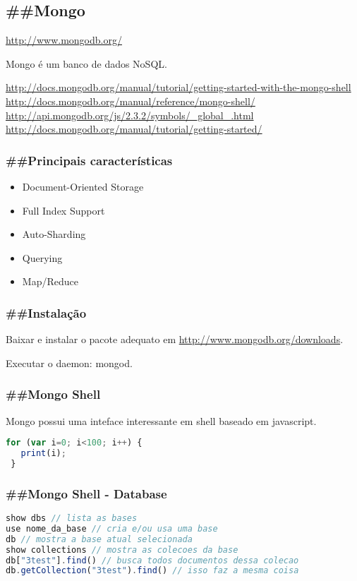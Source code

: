 \documentclass[serif,mathserif]{article}
\begin{document}
\subsection{\#\#Mongo}

\url{http://www.mongodb.org/}

Mongo é um banco de dados NoSQL.

\url{http://docs.mongodb.org/manual/tutorial/getting-started-with-the-mongo-shell}
\url{http://docs.mongodb.org/manual/reference/mongo-shell/}
\url{http://api.mongodb.org/js/2.3.2/symbols/_global_.html}
\url{http://docs.mongodb.org/manual/tutorial/getting-started/}


\subsubsection{\#\#Principais características}
\begin{itemize}
  \item Document-Oriented Storage
  \item Full Index Support
  \item Auto-Sharding
  \item Querying
  \item Map/Reduce
\end{itemize}

\subsubsection{\#\#Instalação}

Baixar e instalar o pacote adequato em \url{http://www.mongodb.org/downloads}.

Executar o daemon: mongod.

\subsubsection{\#\#Mongo Shell}

Mongo possui uma inteface interessante em shell baseado em javascript.

\begin{lstlisting}[language=Javascript]
 for (var i=0; i<100; i++) {
   print(i);
 }
\end{lstlisting}

\subsubsection{\#\#Mongo Shell - Database}

\begin{lstlisting}[language=Javascript]
show dbs // lista as bases
use nome_da_base // cria e/ou usa uma base
db // mostra a base atual selecionada
show collections // mostra as colecoes da base
db["3test"].find() // busca todos documentos dessa colecao
db.getCollection("3test").find() // isso faz a mesma coisa
\end{lstlisting}
\end{document}
